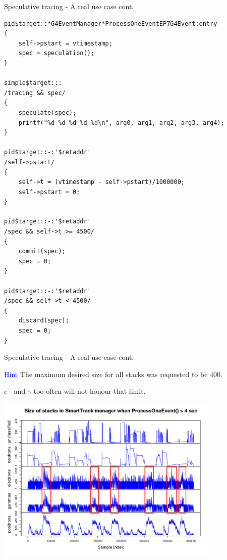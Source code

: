 \documentclass{beamer}
\begin{document}
\begin{frame}[fragile]{Speculative tracing - A real use case cont.}
\lstset{basicstyle=\tiny\ttfamily}
\lstset{frame=single, columns=flexible}
\begin{lstlisting}
pid$target::*G4EventManager*ProcessOneEventEP7G4Event:entry
{
    self->pstart = vtimestamp;
    spec = speculation();
}

simple$target:::
/tracing && spec/
{
    speculate(spec);
    printf("%d %d %d %d %d\n", arg0, arg1, arg2, arg3, arg4);
}

pid$target::-:'$retaddr'
/self->pstart/
{
    self->t = (vtimestamp - self->pstart)/1000000;
    self->pstart = 0;
}

pid$target::-:'$retaddr'
/spec && self->t >= 4500/
{
    commit(spec);
    spec = 0;
}

pid$target::-:'$retaddr'
/spec && self->t < 4500/
{
    discard(spec);
    spec = 0;
}
\end{lstlisting}
\end{frame}

\begin{frame}{Speculative tracing - A real use case cont.}

\textcolor{blue}{Hint} The maximum desired size for all stacks was requested to be 400.

$e^-$ and $\gamma$ too often will not honour that limit.

\begin{center}
  \includegraphics[width=0.8\textwidth]{pathol-all.png}
\end{center}
\end{frame}
\end{document}
